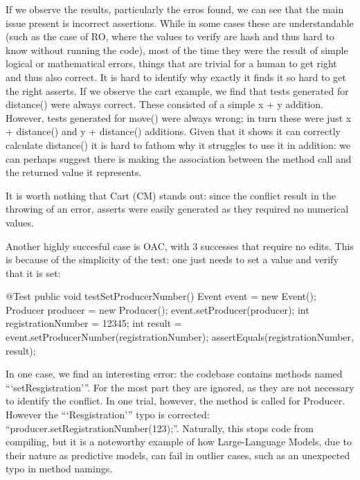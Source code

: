 If we observe the results, particularly the erros found, we can see that the main issue present
is incorrect assertions. While in some cases these are understandable (such as the case of RO,
where the values to verify are hash and thus hard to know without running the code), most of the time
they were the result of simple logical or mathematical errors, things that are trivial for a human to get right
and thus also correct.
It is hard to identify why exactly it finds it so hard to get the right asserts. If we observe the cart example,
we find that tests generated for distance() were always correct. These consisted of a simple x + y addition.
However, tests generated for move() were always wrong; in turn these were just x + distance() and y + distance() additions.
Given that it shows it can correctly calculate distance() it is hard to fathom why it struggles
to use it in addition: we can perhaps suggest there is making the association between the method call and the returned value it represents.

It is worth nothing that Cart (CM) stands out: since the conflict result in the throwing of an error, asserts were easily generated as they required no numerical values.

Another highly succesful case is OAC, with 3 successes that require no edits. This is because
of the simplicity of the test: one just needs to set a value and verify that it is set:
\begin{answer}
    @Test
    public void testSetProducerNumber() {
        Event event = new Event();
        Producer producer = new Producer();
        event.setProducer(producer);
        int registrationNumber = 12345;
        int result = event.setProducerNumber(registrationNumber);
        assertEquals(registrationNumber, result);
    }
\end{answer}
In one case, we find an interesting error: the codebase contains methods named ```setResgistration'''.
For the most part they are ignored, as they are not necessary to identify the conflict. In one trial, however,
the method is called for Producer. However the ```Resgistration''' typo is corrected: ``producer.setRegistrationNumber(123);''.
Naturally, this stops code from compiling, but it is a noteworthy example of how Large-Language Models, due to their nature as 
predictive models, can fail in outlier cases, such as an unexpected typo in method namings.

